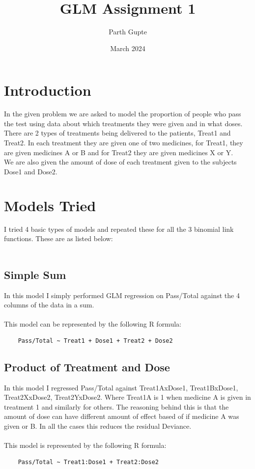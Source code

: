 \documentclass{article}
\title{GLM Assignment 1}
\author{Parth Gupte}
\date{March 2024}
\begin{document}
\maketitle

\section{Introduction}
In the given problem we are asked to model the proportion of people who 
pass the test using data about which treatments they were given and in what doses.
There are 2 types of treatments being delivered to the patients, Treat1 and Treat2.
In each treatment they are given one of two medicines, for Treat1,
they are given medicines A or B and for Treat2 they are given medicines X or Y.\\
We are also given the amount of dose of each treatment given to 
the subjects Dose1 and Dose2.\\

\section{Models Tried}
I tried 4 basic types of models and repeated these for all the 3 binomial
link functions. These are as listed below:\\
\\
\subsection{Simple Sum}
In this model I simply performed GLM regression on 
Pass/Total against the 4 columns of the data in a sum.\\
\\
This model can be represented by the following R formula:\\
\begin{verbatim}
    Pass/Total ~ Treat1 + Dose1 + Treat2 + Dose2    
\end{verbatim}

\subsection{Product of Treatment and Dose}
In this model I regressed Pass/Total against 
Treat1AxDose1, Treat1BxDose1, Treat2XxDose2, Treat2YxDose2.
Where Treat1A is 1 when medicine A is given in treatment 1 and similarly for others.
The reasoning behind this is that the amount of dose can have different
amount of effect based of if medicine A was given or B.
In all the cases this reduces the residual Deviance.\\
\\
This model is represented by the following R formula:\\
\begin{verbatim}
    Pass/Total ~ Treat1:Dose1 + Treat2:Dose2
\end{verbatim}
\end{document}
